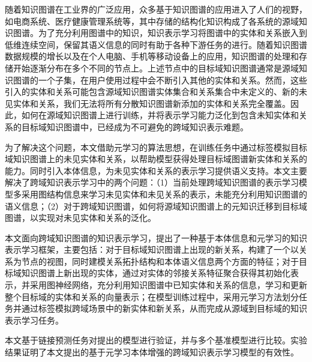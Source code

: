 随着知识图谱在工业界的广泛应用，众多基于知识图谱的应用进入了人们的视野，如电商系统、医疗健康管理系统等，其中存储的结构化知识构成了各系统的源域知识图谱。为了充分利用图谱中的知识，知识表示学习将图谱中的实体和关系嵌入到低维连续空间，保留其语义信息的同时有助于各种下游任务的进行。随着知识图谱数据规模的增长以及在个人电脑、手机等移动设备上的应用，知识图谱的处理和存储开始逐渐分布在多个不同的节点上。上述节点中的目标域知识图谱通常是源域知识图谱的一个子集，在用户使用过程中会不断引入其他的实体和关系。然而，这些引入的实体和关系可能包含源域知识图谱实体集合和关系集合中未定义的、新的未见实体和关系，我们无法将所有分散知识图谱新添加的实体和关系完全覆盖。因此，如何在源域知识图谱上进行训练，并将表示学习能力泛化到包含未知实体和关系的目标域知识图谱中，已经成为不可避免的跨域知识表示难题。

为了解决这个问题，本文借助元学习的算法思想，在训练任务中通过标签模拟目标域知识图谱上的未见实体和关系，以帮助模型获得处理目标域图谱新实体和关系的能力。同时引入本体信息，为未见实体和关系的表示学习提供语义支持。本文主要解决了跨域知识表示学习中的两个问题：（1）当前处理跨域知识图谱的表示学习模型多采用图结构信息来学习未见实体和未见关系的表示，未能充分利用知识图谱的语义信息；（2）对于跨域知识图谱，如何将源域知识图谱上的元知识迁移到目标域图谱，以实现对未见实体和关系的泛化。

本文面向跨域知识图谱的知识表示学习，提出了一种基于本体信息和元学习的知识表示学习框架，主要包括：对于目标域知识图谱上出现的新关系，构建了一个以关系为节点的视图，同时建模关系拓扑结构和本体语义信息两个方面的特征；对于目标域知识图谱上新出现的实体，通过对实体的邻接关系特征聚合获得其初始化表示，并采用图神经网络，充分利用知识图谱中已知实体和关系的信息，学习和更新整个目标域的实体和关系的向量表示；在模型训练过程中，采用元学习方法划分任务并通过标签模拟跨域场景中的新实体和新关系，从而完成从源域到目标域的知识表示学习任务。

本文基于链接预测任务对提出的模型进行验证，并与多个基准模型进行比较。实验结果证明了本文提出的基于元学习本体增强的跨域知识表示学习模型的有效性。